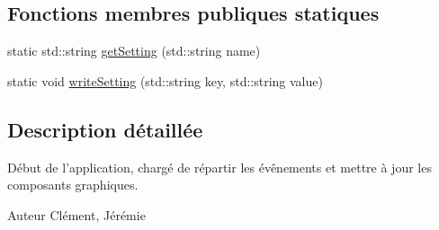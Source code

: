 \subsection*{Fonctions membres publiques statiques}
\begin{DoxyCompactItemize}
\item 
static std\+::string \hyperlink{class_window_runner_a12ef4096096e5b65bc4b06904f15285c}{get\+Setting} (std\+::string name)
\item 
static void \hyperlink{class_window_runner_a971893c830bfed6ac2785966647f9941}{write\+Setting} (std\+::string key, std\+::string value)
\end{DoxyCompactItemize}


\subsection{Description détaillée}
Début de l'application, chargé de répartir les évênements et mettre à jour les composants graphiques. 

\begin{DoxyAuthor}{Auteur}
Clément, Jérémie 
\end{DoxyAuthor}


